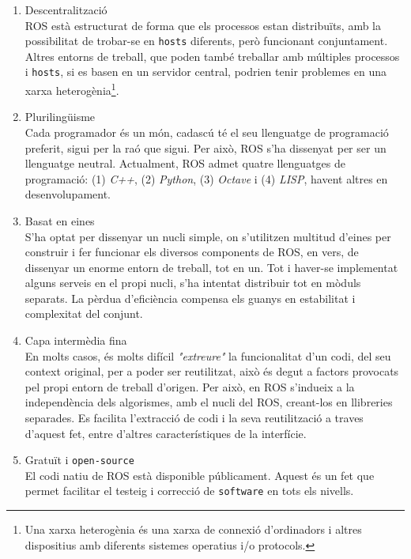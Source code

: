 \documentclass[12pt,a4paper,final,twoside]{article}
\begin{document}
\begin{enumerate}

\item Descentralització\\
ROS està estructurat de forma que els processos estan distribuïts, amb la possibilitat de trobar-se en \texttt{hosts} diferents, però funcionant conjuntament. Altres entorns de treball, que poden també treballar amb múltiples processos i \texttt{hosts}, si es basen en un servidor central, podrien tenir problemes en una xarxa heterogènia\footnote{Una xarxa heterogènia és una xarxa de connexió d'ordinadors i altres dispositius amb diferents sistemes operatius i/o protocols.\cite{Delphinanto2011}}.

\item Plurilingüisme\\
Cada programador és un món, cadascú té el seu llenguatge de programació preferit, sigui per la raó que sigui. Per això, ROS s'ha dissenyat per ser un llenguatge neutral. Actualment, ROS admet quatre llenguatges de programació: (1) \textit{C++}, (2) \textit{Python}, (3) \textit{Octave} i (4) \textit{LISP}, havent altres en desenvolupament.

\item Basat en eines\\
S'ha optat per dissenyar un nucli simple, on s'utilitzen multitud d'eines per construir i fer funcionar els diversos components de ROS, en vers, de dissenyar un enorme entorn de treball, tot en un. Tot i haver-se implementat alguns serveis en el propi nucli, s'ha intentat distribuir tot en mòduls separats. La pèrdua d'eficiència compensa els guanys en estabilitat i complexitat del conjunt.

\item Capa intermèdia fina\\
En molts casos, és molts difícil \textit{"extreure"} la funcionalitat d'un codi, del seu context original, per a poder ser reutilitzat, això és degut a factors provocats pel propi entorn de treball d'origen. Per això, en ROS s'indueix a la independència dels algorismes, amb el nucli del ROS, creant-los en llibreries separades. Es facilita l'extracció de codi i la seva reutilització a traves d'aquest fet, entre d'altres característiques de la interfície.

\item Gratuït i \texttt{open-source}\\
El codi natiu de ROS està disponible públicament. Aquest és un fet que permet facilitar el testeig i correcció de \texttt{software} en tots els nivells. 

\end{enumerate}
\end{document}
